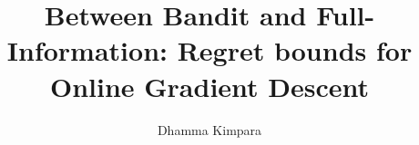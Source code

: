 \documentclass{article}
\theoremstyle{definition}
\begin{document}
\title{Between Bandit and Full-Information: Regret bounds for Online Gradient Descent}
 \author{Dhamma Kimpara}

\maketitle







\newpage




\newpage

\appendix


\end{document}
